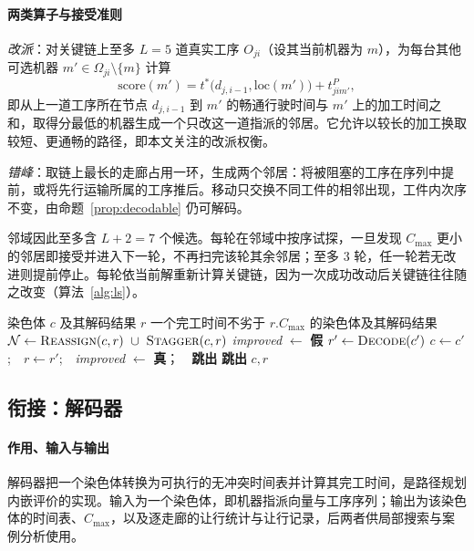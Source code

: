 \documentclass[manuscript,screen,review]{acmart}
\newcommand{\LSL}{5}                      %
\newcommand{\LSNbr}{7}                    %
\newcommand{\LSRounds}{3}                 %
\begin{document}
\paragraph{两类算子与接受准则}
\emph{改派}：对关键链上至多 $L=\LSL$ 道真实工序 $O_{ji}$（设其当前机器为 $m$），为每台其他可选机器 $m'\in\Omega_{ji}\setminus\{m\}$ 计算
\begin{equation}
\label{eq:reassign}
\mathrm{score}(m')=t^{*}\bigl(d_{j,i-1},\mathrm{loc}(m')\bigr)
+t^{P}_{jim'},
\end{equation}
即从上一道工序所在节点 $d_{j,i-1}$ 到 $m'$ 的畅通行驶时间与 $m'$ 上的加工时间之和，取得分最低的机器生成一个只改这一道指派的邻居。它允许以较长的加工换取较短、更通畅的路径，即本文关注的改派权衡。

\emph{错峰}：取链上最长的走廊占用一环，生成两个邻居：将被阻塞的工序在序列中提前，或将先行运输所属的工序推后。移动只交换不同工件的相邻出现，工件内次序不变，由命题~\ref{prop:decodable} 仍可解码。

邻域因此至多含 $L+2=\LSNbr$ 个候选。每轮在邻域中按序试探，一旦发现 $C_{\max}$ 更小的邻居即接受并进入下一轮，不再扫完该轮其余邻居；至多 $\LSRounds$ 轮，任一轮若无改进则提前停止。每轮依当前解重新计算关键链，因为一次成功改动后关键链往往随之改变（算法~\ref{alg:ls}）。

\begin{algorithm}[t]
\caption{\textsc{ContentionGuidedSearch}：按让行记录的局部搜索}
\label{alg:ls}
\small
\begin{algorithmic}[1]
\Require 染色体 $c$ 及其解码结果 $r$
\Ensure 一个完工时间不劣于 $r.C_{\max}$ 的染色体及其解码结果
\For{$\textit{round}=1$ \textbf{到} $\LSRounds$}
  \State $\mathcal{N}\gets\textsc{Reassign}(c,r)\ \cup\ \textsc{Stagger}(c,r)$
  \State \textit{improved} $\gets$ \textbf{假}
    \State $r'\gets\textsc{Decode}(c')$
      \State $c\gets c'$;\ \ $r\gets r'$;\ \ \textit{improved} $\gets$
             \textbf{真}；\ \ \textbf{跳出}
    \EndIf
  \EndFor
   \State \textbf{跳出} \EndIf
\EndFor
\State \Return $c,r$
\end{algorithmic}
\end{algorithm}

\subsection{衔接：解码器}
\label{sec:upper}

\paragraph{作用、输入与输出}
解码器把一个染色体转换为可执行的无冲突时间表并计算其完工时间，是路径规划内嵌评价的实现。输入为一个染色体，即机器指派向量与工序序列；输出为该染色体的时间表、$C_{\max}$，以及逐走廊的让行统计与让行记录，后两者供局部搜索与案例分析使用。
\end{document}

